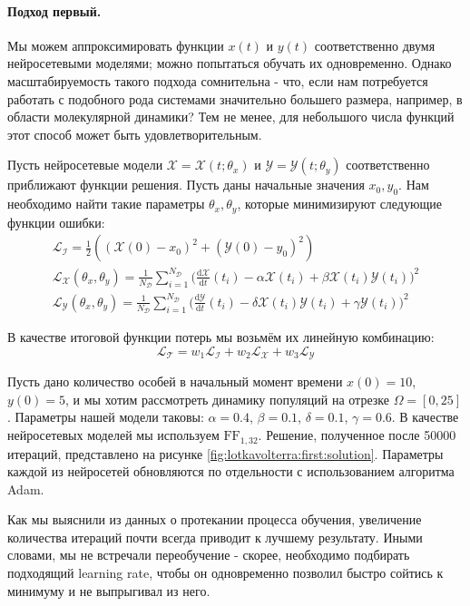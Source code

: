 \documentclass[a4paper, 12pt]{article}
\begin{document}
\paragraph{Подход первый.} Мы можем аппроксимировать функции $x(t)$ и $y(t)$ соответственно двумя нейросетевыми моделями; можно попытаться обучать их одновременно. Однако масштабируемость такого подхода сомнительна - что, если нам потребуется работать с подобного рода системами значительно большего размера, например, в области молекулярной динамики? Тем не менее, для небольшого числа функций этот способ может быть удовлетворительным.

Пусть нейросетевые модели $\mathcal{X} = \mathcal{X}(t; \theta_x)$ и $\mathcal{Y} = \mathcal{Y}(t; \theta_y)$ соответственно приближают функции решения. Пусть даны начальные значения $x_0, y_0$. Нам необходимо найти такие параметры $\theta_x, \theta_y$, которые минимизируют следующие функции ошибки:
\begin{equation} \label{eq:lotkavolterra:losses}
\begin{gathered}
    \mathcal{L_I} = \frac{1}{2}((\mathcal{X}(0) - x_0)^2 + (\mathcal{Y}(0) - y_0)^2) \\
    \mathcal{L_X}(\theta_x, \theta_y) = \frac{1}{N_\mathcal{D}} \sum_{i=1}^{N_\mathcal{D}} \Big(\frac{\mathrm{d}\mathcal{X}}{\mathrm{d}t}(t_i)  - \alpha\mathcal{X}(t_i) + \beta\mathcal{X}(t_i)\mathcal{Y}(t_i)\Big)^2 \\
    \mathcal{L_Y}(\theta_x, \theta_y) = \frac{1}{N_\mathcal{D}} \sum_{i=1}^{N_\mathcal{D}} \Big(\frac{\mathrm{d}\mathcal{Y}}{\mathrm{d}t}(t_i) - \delta\mathcal{X}(t_i)\mathcal{Y}(t_i) + \gamma\mathcal{Y}(t_i)\Big)^2
\end{gathered}
\end{equation}

В качестве итоговой функции потерь мы возьмём их линейную комбинацию:
$$
\mathcal{L_T} = w_1\mathcal{L_I} + w_2\mathcal{L_X} + w_3\mathcal{L_Y}
$$

Пусть дано количество особей в начальный момент времени $x(0) = 10$, $y(0) = 5$, и мы хотим рассмотреть динамику популяций на отрезке $\Omega = [0, 25]$. Параметры нашей модели таковы: $\alpha = 0.4$, $\beta = 0.1$, $\delta = 0.1$, $\gamma = 0.6$. В качестве нейросетевых моделей мы используем $\mathrm{FF}_{1,32}$. Решение, полученное после 50000 итераций, представлено на рисунке \ref{fig:lotkavolterra:first:solution}. Параметры каждой из нейросетей обновляются по отдельности с использованием алгоритма Adam.

Как мы выяснили из данных о протекании процесса обучения, увеличение количества итераций почти всегда приводит к лучшему результату. Иными словами, мы не встречали переобучение - скорее, необходимо подбирать подходящий learning rate, чтобы он одновременно позволил быстро сойтись к минимуму и не выпрыгивал из него.
\end{document}
